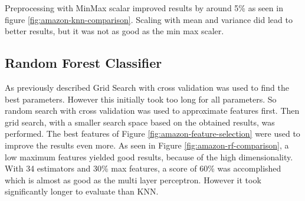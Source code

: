 Preprocessing with MinMax scalar improved results by around 5\% as seen in figure \ref{fig:amazon-knn-comparison}.
Scaling with mean and variance did lead to better results, but it was not as good as the min max scaler.




\subsection{Random Forest Classifier}

As previously described Grid Search with cross validation was used to find the best parameters.
However this initially took too long for all parameters.
So random search with cross validation was used to approximate features first.
Then grid search, with a smaller search space based on the obtained results, was performed.
The best features of Figure \ref{fig:amazon-feature-selection} were used to improve the results even more. 
As seen in Figure \ref{fig:amazon-rf-comparison}, a low maximum features yielded good results, because of the high dimensionality.
With 34 estimators and 30\% max features, a score of 60\% was accomplished which is almost as good as the multi layer perceptron.
However it took significantly longer to evaluate than KNN.



